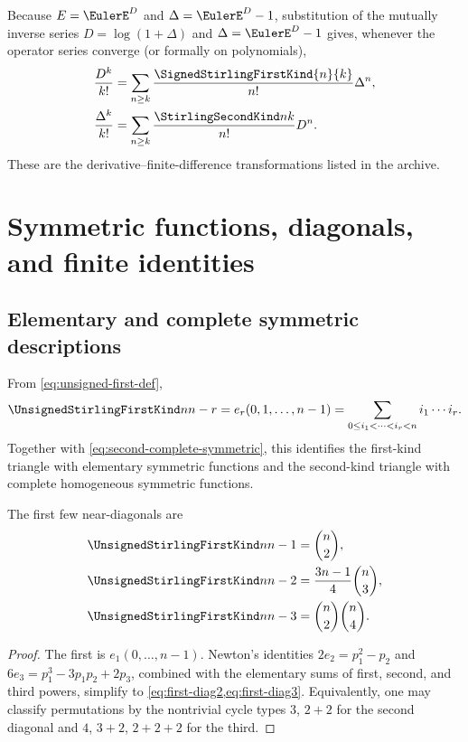 \documentclass[11pt,a4paper,oneside,openany]{book}
\theoremstyle{definition}
\theoremstyle{remark}
\begin{document}
Because $E=\EulerE^D$ and $\Delta=\EulerE^D-1$, substitution of the mutually inverse series
$D=\log(1+\Delta)$ and $\Delta=\EulerE^D-1$ gives, whenever the operator series converge
(or formally on polynomials),
\begin{align}
 \frac{D^k}{k!}
   &=\sum_{n\ge k}\frac{\SignedStirlingFirstKind{n}{k}}{n!}\Delta^n,
   \label{eq:der-from-diff}\\
 \frac{\Delta^k}{k!}
   &=\sum_{n\ge k}\frac{\StirlingSecondKind nk}{n!}D^n.
   \label{eq:diff-from-der}
\end{align}
These are the derivative--finite-difference transformations listed in the archive.

\chapter{Symmetric functions, diagonals, and finite identities}
\label{ch:stirling-identities}

\section{Elementary and complete symmetric descriptions}
From \cref{eq:unsigned-first-def},
\begin{equation}\label{eq:first-elementary}
 \UnsignedStirlingFirstKind n{n-r}=e_r(0,1,\ldots,n-1)
 =\sum_{0\le i_1<\cdots<i_r<n}i_1\cdots i_r.
\end{equation}
Together with \cref{eq:second-complete-symmetric}, this identifies the first-kind
triangle with elementary symmetric functions and the second-kind triangle with
complete homogeneous symmetric functions.

The first few near-diagonals are
\begin{align}
 \UnsignedStirlingFirstKind n{n-1}&=\binom n2,\label{eq:first-diag1}\\
 \UnsignedStirlingFirstKind n{n-2}&=\frac{3n-1}{4}\binom n3,\label{eq:first-diag2}\\
 \UnsignedStirlingFirstKind n{n-3}&=\binom n2\binom n4.\label{eq:first-diag3}
\end{align}
\begin{proof}
The first is $e_1(0,\ldots,n-1)$.  Newton's identities
$2e_2=p_1^2-p_2$ and $6e_3=p_1^3-3p_1p_2+2p_3$, combined with the elementary sums
of first, second, and third powers, simplify to \cref{eq:first-diag2,eq:first-diag3}.
Equivalently, one may classify permutations by the nontrivial cycle types
$3$, $2+2$ for the second diagonal and $4$, $3+2$, $2+2+2$ for the third.
\end{proof}
\end{document}

